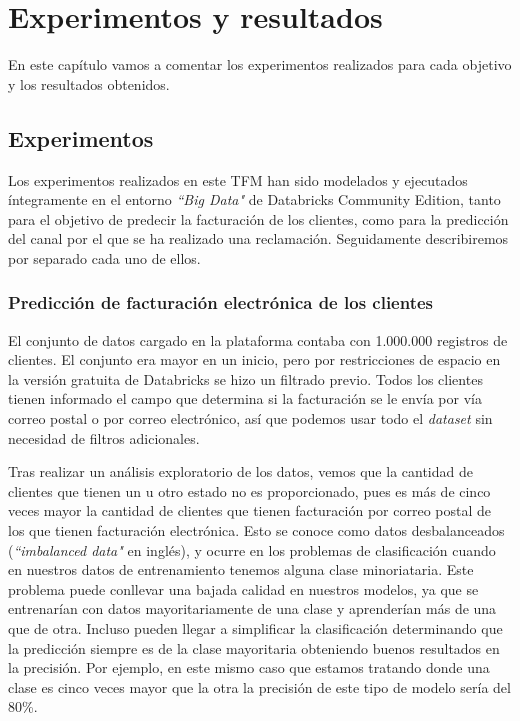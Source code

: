 \chapter{Experimentos y resultados}
\label{chapter:experimentos_y_resultados}
En este capítulo vamos a comentar los experimentos realizados para cada objetivo y los resultados obtenidos.

\section{Experimentos}
Los experimentos realizados en este TFM han sido modelados y ejecutados íntegramente en el entorno \textit{``Big Data"} de Databricks Community Edition, tanto para el objetivo de predecir la facturación de los clientes, como para la predicción del canal por el que se ha realizado una reclamación. Seguidamente describiremos por separado cada uno de ellos.

\subsection{Predicción de facturación electrónica de los clientes}

El conjunto de datos cargado en la plataforma contaba con 1.000.000 registros de clientes. El conjunto era mayor en un inicio, pero por restricciones de espacio en la versión gratuita de Databricks se hizo un filtrado previo.
Todos los clientes tienen informado el campo que determina si la facturación se le envía por vía correo postal o por correo electrónico, así que podemos usar todo el \textit{dataset} sin necesidad de filtros adicionales.


Tras realizar un análisis exploratorio de los datos, vemos que la cantidad de clientes que tienen un u otro estado no es proporcionado, pues es más de cinco veces mayor la cantidad de clientes que tienen facturación por correo postal de los que tienen facturación electrónica.
Esto se conoce como datos desbalanceados (\textit{``imbalanced data"} en inglés), y ocurre en los problemas de clasificación cuando en nuestros datos de entrenamiento tenemos alguna clase minoriataria. Este problema puede conllevar una bajada calidad en nuestros modelos, ya que se entrenarían con datos mayoritariamente de una clase y aprenderían más de una que de otra. Incluso pueden llegar a simplificar la clasificación determinando que la predicción siempre es de la clase mayoritaria obteniendo buenos resultados en la precisión.
Por ejemplo, en este mismo caso que estamos tratando donde una clase es cinco veces mayor que la otra la precisión de este tipo de modelo sería del 80\%.

